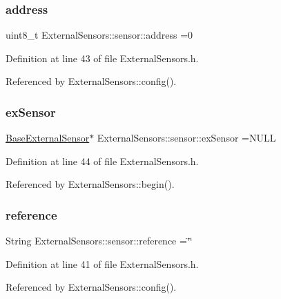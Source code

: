 \subsubsection{\texorpdfstring{address}{address}}
{\footnotesize\ttfamily uint8\+\_\+t External\+Sensors\+::sensor\+::address =0}



Definition at line 43 of file External\+Sensors.\+h.



Referenced by External\+Sensors\+::config().

\mbox{\label{structExternalSensors_1_1sensor_a9bca150fd468b8d0e090e6d72c5c2b48}} 
\subsubsection{\texorpdfstring{ex\+Sensor}{exSensor}}
{\footnotesize\ttfamily \hyperlink{classBaseExternalSensor}{Base\+External\+Sensor}$\ast$ External\+Sensors\+::sensor\+::ex\+Sensor =N\+U\+LL}



Definition at line 44 of file External\+Sensors.\+h.



Referenced by External\+Sensors\+::begin().

\mbox{\label{structExternalSensors_1_1sensor_afed5bdfd49732202a368b600cb8396fe}} 
\subsubsection{\texorpdfstring{reference}{reference}}
{\footnotesize\ttfamily String External\+Sensors\+::sensor\+::reference =\char`\"{}\char`\"{}}



Definition at line 41 of file External\+Sensors.\+h.



Referenced by External\+Sensors\+::config().

\mbox{\label{structExternalSensors_1_1sensor_a6acfdb02c742c2110d7bd2b5d9fce9e7}} 
